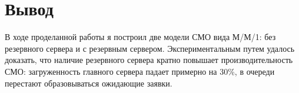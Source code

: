 \chapter{Вывод}
\label{ch:сhap5}

В ходе проделанной работы я построил две модели СМО вида М/М/1: без резервного сервера и с резервным сервером. Экспериментальным 
путем удалось доказать, что наличие резервного сервера кратно повышает производительность СМО: загруженность главного сервера
падает примерно на 30\%, в очереди перестают образовываться ожидающие заявки.
\endinput